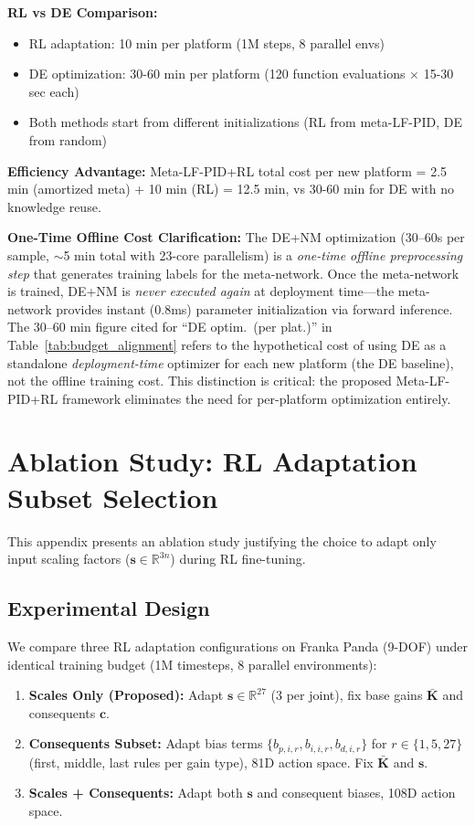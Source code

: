 \documentclass[DTMColor]{ROB-New}
\begin{document}
\textbf{RL vs DE Comparison:} 
\begin{itemize}[leftmargin=*, itemsep=1pt]
    \item RL adaptation: 10 min per platform (1M steps, 8 parallel envs)
    \item DE optimization: 30-60 min per platform (120 function evaluations $\times$ 15-30 sec each)
    \item Both methods start from different initializations (RL from meta-LF-PID, DE from random)
\end{itemize}

\textbf{Efficiency Advantage:} Meta-LF-PID+RL total cost per new platform = 2.5 min (amortized meta) + 10 min (RL) = 12.5 min, vs 30-60 min for DE with no knowledge reuse.

{\color{blue}\textbf{One-Time Offline Cost Clarification:} The DE+NM optimization (30--60s per sample, $\sim$5 min total with 23-core parallelism) is a \textit{one-time offline preprocessing step} that generates training labels for the meta-network. Once the meta-network is trained, DE+NM is \textit{never executed again} at deployment time---the meta-network provides instant (0.8ms) parameter initialization via forward inference. The 30--60 min figure cited for ``DE optim.~(per plat.)'' in Table~\ref{tab:budget_alignment} refers to the hypothetical cost of using DE as a standalone \textit{deployment-time} optimizer for each new platform (the DE baseline), not the offline training cost. This distinction is critical: the proposed Meta-LF-PID+RL framework eliminates the need for per-platform optimization entirely.}

\newpage
\section{Ablation Study: RL Adaptation Subset Selection}
\label{app:ablation_rl}

This appendix presents an ablation study justifying the choice to adapt only input scaling factors ($\bm{s} \in \mathbb{R}^{3n}$) during RL fine-tuning.

\subsection{Experimental Design}

We compare three RL adaptation configurations on Franka Panda (9-DOF) under identical training budget (1M timesteps, 8 parallel environments):

\begin{enumerate}[leftmargin=*, itemsep=2pt]
    \item \textbf{Scales Only (Proposed):} Adapt $\bm{s} \in \mathbb{R}^{27}$ (3 per joint), fix base gains $\bar{\bm{K}}$ and consequents $\bm{c}$.
    \item \textbf{Consequents Subset:} Adapt bias terms $\{b_{p,i,r}, b_{i,i,r}, b_{d,i,r}\}$ for $r \in \{1,5,27\}$ (first, middle, last rules per gain type), 81D action space. Fix $\bar{\bm{K}}$ and $\bm{s}$.
    \item \textbf{Scales + Consequents:} Adapt both $\bm{s}$ and consequent biases, 108D action space.
\end{enumerate}
\end{document}

